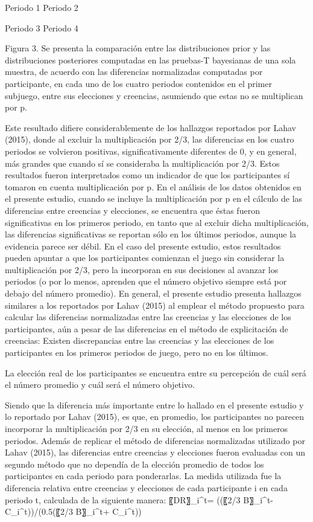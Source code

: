   
Periodo 1					Periodo 2
  
Periodo 3					Periodo 4

Figura 3. Se presenta la comparación entre las distribuciones prior y las distribuciones posteriores computadas en las pruebas-T bayesianas de una sola muestra, de acuerdo con las diferencias normalizadas computadas por participante, en cada uno de los cuatro periodos contenidos en el primer subjuego, entre sus elecciones y creencias, asumiendo que estas no se multiplican por p.

Este resultado difiere considerablemente de los hallazgos reportados por Lahav (2015), donde al excluir la multiplicación por 2/3, las diferencias en los cuatro periodos se volvieron positivas, significativamente diferentes de 0, y en general,  más grandes que cuando sí se consideraba la multiplicación por 2/3. Estos resultados fueron interpretados como un indicador de que los participantes sí tomaron en cuenta multiplicación por p.
En el análisis de los datos obtenidos en el presente estudio, cuando se incluye la multiplicación por p en el cálculo de las diferencias entre creencias y elecciones, se encuentra que éstas fueron significativas en los primeros periodo, en tanto que  al excluir dicha multiplicación, las diferencias significativas se reportan sólo en los últimos periodos, aunque la evidencia parece ser débil. En el caso del presente estudio, estos resultados pueden apuntar a que los participantes comienzan el juego sin considerar la multiplicación por 2/3, pero la incorporan en sus decisiones al avanzar los periodos (o por lo menos, aprenden que el número objetivo siempre está por debajo del número promedio).
En general, el presente estudio presenta hallazgos similares a los reportados por Lahav (2015) al emplear el método propuesto para calcular las diferencias normalizadas entre las creencias y las elecciones de los participantes, aún a pesar de las diferencias en el método de explicitación de creencias: 
	Existen discrepancias entre las creencias y las elecciones de los participantes en los primeros periodos de juego, pero no en los últimos.

	La elección real de los participantes se encuentra entre su percepción de cuál será el número promedio y cuál será el número objetivo.

Siendo que la diferencia más importante entre lo hallado en el presente estudio y lo reportado por Lahav (2015), es que, en promedio, los participantes no parecen incorporar la multiplicación por 2/3 en su elección, al menos en los primeros periodos.
Además de replicar el método de diferencias normalizadas utilizado por Lahav (2015), las diferencias entre creencias y elecciones fueron evaluadas con un segundo método que no dependía de la elección promedio de todos los participantes en cada periodo para ponderarlas. La medida utilizada fue la diferencia relativa entre creencias y elecciones de cada participante i en cada periodo t, calculada de la siguiente manera:
〖DR〗_i^t=  ((〖2/3 B〗_i^t- C_i^t))/(0.5(〖2/3 B〗_i^t+ C_i^t))

